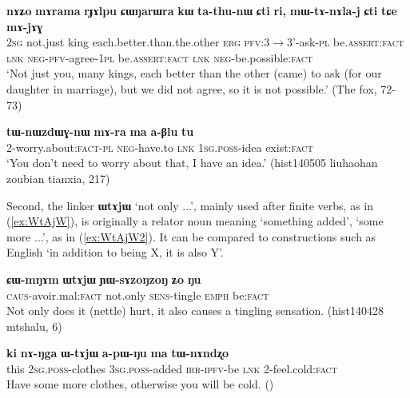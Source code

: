 \documentclass[oldfontcommands,oneside,a4paper,11pt]{article}
\newcommand{\ipa}[1]{\mbox{\phon\textbf{#1}}} %
\begin{document}
\begin{exe}
\ex \label{ex:marama}
\gll \ipa{nɤʑo} 	\ipa{mɤrama} 	\ipa{rɟɤlpu} 	\ipa{ɕɯŋarɯra} 	\ipa{kɯ} 	\ipa{ta-thu-nɯ} 	\ipa{ɕti} 	\ipa{ri,} 	\ipa{mɯ-tɤ-nɤla-j} 	\ipa{ɕti} 	\ipa{tɕe} 	\ipa{mɤ-jɤɣ}  \\
\textsc{2sg} not.just king each.better.than.the.other \textsc{erg} \textsc{pfv}:3$\rightarrow$3'-ask-\textsc{pl} be.\textsc{assert:fact} \textsc{lnk} \textsc{neg-pfv}-agree-\textsc{1pl} be.\textsc{assert:fact} \textsc{lnk} \textsc{neg}-be.possible:\textsc{fact} \\
\glt `Not just you, many kings, each better than the other (came) to ask (for our daughter in marriage), but we did not agree, so it is not possible.' (The fox, 72-73)
\end{exe}

\begin{exe}
\ex \label{ex:marama2}
\gll
\ipa{tɯ-nɯzdɯɣ-nɯ} 	\ipa{mɤ-ra} 	\ipa{ma} 	\ipa{a-βlu} 	\ipa{tu}\\
2-worry.about:\textsc{fact-pl} \textsc{neg}-have.to \textsc{lnk} \textsc{1sg.poss}-idea exist:\textsc{fact}\\
\glt `You don't need to worry about that, I have an idea.' (hist140505 liuhaohan zoubian tianxia, 217)
\end{exe}
 

Second, the linker \ipa{ɯtɤjɯ} `not only ...', mainly used after finite verbs, as in (\ref{ex:WtAjW}), is originally a relator noun meaning `something added', `some more ...', as in (\ref{ex:WtAjW2}). It can be compared to constructions such as English `in addition to being X, it is also Y'.

\begin{exe}
\ex \label{ex:WtAjW}
\gll \ipa{ɕɯ-mŋɤm} 	\ipa{ɯtɤjɯ} 	\ipa{ɲɯ-sɤzoŋzoŋ} 	\ipa{ʑo} 	\ipa{ŋu}  \\
\textsc{caus}-avoir.mal:\textsc{fact} not.only \textsc{sens}-tingle \textsc{emph} be:\textsc{fact} \\
\glt Not only does it (nettle) hurt, it also causes a tingling sensation. (hist140428 mtshalu, 6)
\end{exe}

\begin{exe}
\ex \label{ex:WtAjW2}
\gll \ipa{ki} 	\ipa{nɤ-ŋga} 	\ipa{ɯ-tɤjɯ} 	\ipa{a-pɯ-ŋu} 	\ipa{ma} 	\ipa{tɯ-nɤndʐo} \\
this \textsc{2sg.poss}-clothes \textsc{3sg.poss}-added \textsc{irr-ipfv}-be \textsc{lnk} 2-feel.cold:\textsc{fact} \\
\glt Have some more clothes, otherwise you will be cold. (\citealt{jacques15japhug})
\end{exe}
\end{document}

